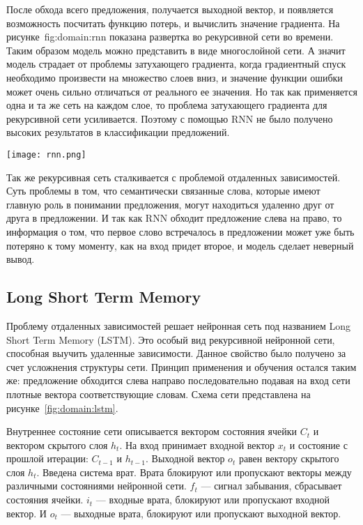 После обхода всего предложения, получается выходной вектор, и появляется возможность посчитать функцию потерь, и вычислить значение градиента. На рисунке~{fig:domain:rnn} показана развертка во рекурсивной сети во времени. Таким образом модель можно представить в виде многослойной сети. А значит модель страдает от проблемы затухающего градиента, когда градиентный спуск необходимо произвести на множество слоев вниз, и значение функции ошибки может очень сильно отличаться от реального ее значения. Но так как применяется одна и та же сеть на каждом слое, то проблема затухающего градиента для рекурсивной сети усиливается. Поэтому с помощью RNN не было получено высоких результатов в классификации предложений.

\begin{center}
  \texttt{[image: rnn.png]}
  \label{fig:domain:rnn}
\end{center}

Так же рекурсивная сеть сталкивается с проблемой отдаленных зависимостей. Суть проблемы в том, что семантически связанные слова, которые имеют главную роль в понимании предложения, могут находиться удаленно друг от друга в предложении. И так как RNN обходит предложение слева на право, то информация о том, что первое слово встречалось в предложении может уже быть потеряно к тому моменту, как на вход придет второе, и модель сделает неверный вывод.

\subsection{Long Short Term Memory}\label{sec:domain:lstm}
Проблему отдаленных зависимостей решает нейронная сеть под названием Long Short Term Memory (LSTM). Это особый вид рекурсивной нейронной сети, способная выучить удаленные зависимости. Данное свойство было получено за счет усложнения структуры сети. Принцип применения и обучения остался таким же: предложение обходится слева направо последовательно подавая на вход сети плотные вектора соответствующие словам. Схема сети представлена на рисунке~\ref{fig:domain:lstm}.

Внутреннее состояние сети описывается вектором состояния ячейки $C_t$ и вектором скрытого слоя $h_t$. На вход принимает входной вектор $x_t$ и состояние с прошлой итерации: $C_{t-1}$ и $h_{t-1}$. Выходной вектор $o_t$ равен вектору скрытого слоя $h_t$. Введена система врат. Врата блокируют или пропускают векторы между различными состояниями нейронной сети. $f_{t}$ --- сигнал забывания, сбрасывает состояния ячейки. $i_{t}$ --- входные врата, блокируют или пропускают входной вектор. И $o_t$ --- выходные врата, блокируют или пропускают выходной вектор\cite{LSTM}.

